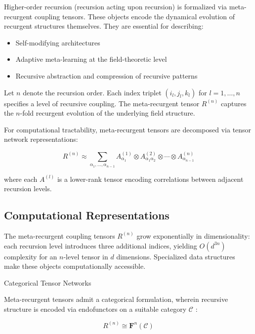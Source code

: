 Higher-order recursion (recursion acting upon recursion) is formalized via meta-recurgent coupling tensors. These objects encode the dynamical evolution of recurgent structures themselves. They are essential for describing:
\begin{itemize}
    \item Self-modifying architectures
    \item Adaptive meta-learning at the field-theoretic level
    \item Recursive abstraction and compression of recursive patterns
\end{itemize}

Let \(n\) denote the recursion order. Each index triplet \((i_l, j_l, k_l)\) for \(l = 1, \ldots, n\) specifies a level of recursive coupling. The meta-recurgent tensor \(R^{(n)}\) captures the \(n\)-fold recurgent evolution of the underlying field structure.

For computational tractability, meta-recurgent tensors are decomposed via tensor network representations:

\begin{equation}
R^{(n)} \approx \sum_{\alpha_1, \ldots, \alpha_{n-1}} A^{(1)}_{\alpha_1} \otimes A^{(2)}_{\alpha_1 \alpha_2} \otimes \cdots \otimes A^{(n)}_{\alpha_{n-1}}
\end{equation}

where each \(A^{(l)}\) is a lower-rank tensor encoding correlations between adjacent recursion levels.

\subsection{Computational Representations}

The meta-recurgent coupling tensors \(R^{(n)}\) grow exponentially in dimensionality: each recursion level introduces three additional indices, yielding \(O(d^{3n})\) complexity for an \(n\)-level tensor in \(d\) dimensions. Specialized data structures make these objects computationally accessible.

Categorical Tensor Networks

Meta-recurgent tensors admit a categorical formulation, wherein recursive structure is encoded via endofunctors on a suitable category \(\mathcal{C}\) \autocite{MacLane1998}:

\begin{equation}
R^{(n)} \cong \mathbf{F}^n(\mathcal{C})
\end{equation}

